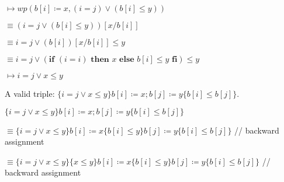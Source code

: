 \documentclass{article}
\begin{document}
\qquad \qquad $ \mapsto wp(b[i] \coloneqq x, (i=j) \vee (b[i] \leq y))$

\qquad \qquad $ \equiv (i=j \vee (b[i] \leq y))[x/ b[i]]$

\qquad \qquad $ \equiv i=j \vee (b[i])[x/ b[i]] \leq y$

\qquad \qquad $ \equiv i=j \vee (\textbf{if } (i=i) \textbf{ then } x \textbf{ else } b[i] \leq y \textbf{ fi}) \leq y$

\qquad \qquad $ \mapsto i=j \vee x \leq y$

\vspace{10pt}

A valid triple: $ \{i=j \vee x \leq y\}b[i] \coloneqq x;b[j] \coloneqq y \{b[i] \leq b[j]\}$.

\vspace{10pt}

$ \{i=j \vee x \leq y\}b[i] \coloneqq x;b[j] \coloneqq y \{b[i] \leq b[j]\}$

\qquad \qquad $ \equiv \{i=j \vee x \leq y\}b[i] \coloneqq x \{b[i] \leq y\} b[j] \coloneqq y \{b[i] \leq b[j]\}$ \qquad \qquad // backward assignment

\qquad \qquad $ \equiv \{i=j \vee x \leq y\}\{x \leq y\} b[i] \coloneqq x \{b[i] \leq y\} b[j] \coloneqq y \{b[i] \leq b[j]\}$ \qquad // backward assignment
\end{document}
